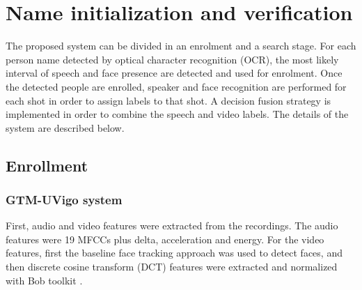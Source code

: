 \section{Name initialization and verification}
\label{sec:verification}


The proposed system can be divided in an enrolment and a search stage. For each person name detected by optical character recognition (OCR), the most likely interval
of speech and face presence are detected and used for enrolment.
Once the detected people are enrolled, speaker and face recognition
are performed for each shot in order to assign labels to that shot. 
A decision fusion strategy is implemented in order to combine the speech and video labels. The details of the system
are described below.

\subsection{Enrollment}

\subsubsection{GTM-UVigo system}
First, audio and video features were extracted from the recordings. The audio features were 19 MFCCs plus delta, acceleration and energy. For the video features, first
the baseline face tracking approach was used to detect faces, and then discrete cosine transform (DCT) features \cite{mccool2009} were extracted and normalized with Bob toolkit \cite{bob2012}.

